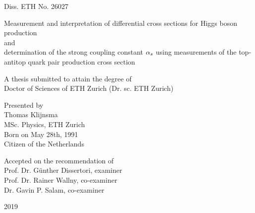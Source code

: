 \documentclass[draftmode]{main}
\begin{document}
\begin{center}
\Large Diss. ETH No. 26027
\end{center}

\vspace{3cm}
\begin{center}
\huge
Measurement and interpretation of differential cross sections for Higgs boson production
\\
and
\\
determination of the strong coupling constant $\alpha_s$ using measurements of the top-antitop quark pair production cross section\par
\end{center}

\vspace{1cm}
\begin{center}
\large
A thesis submitted to attain the degree of \\
Doctor of Sciences of ETH Zurich (Dr. sc. ETH Zurich)
\end{center}

\vspace{1cm}
\begin{center}
\large
Presented by \\[10pt]
{\huge Thomas Klijnsma} \\[10pt]
MSc. Physics, ETH Zurich \\
Born on May 28th, 1991 \\
Citizen of the Netherlands\par
\end{center}

\vspace{1cm}
\begin{center}
\large
Accepted on the recommendation of \\[5pt]
Prof. Dr. G{\"u}nther Dissertori, examiner \\
Prof. Dr. Rainer Wallny, co-examiner \\
Dr. Gavin P. Salam, co-examiner\par
\end{center}

\vspace{1cm}
\begin{center}
\large
2019
\end{center}

\thispagestyle{empty} %
\null\newpage\thispagestyle{empty}\null %
\end{document}
